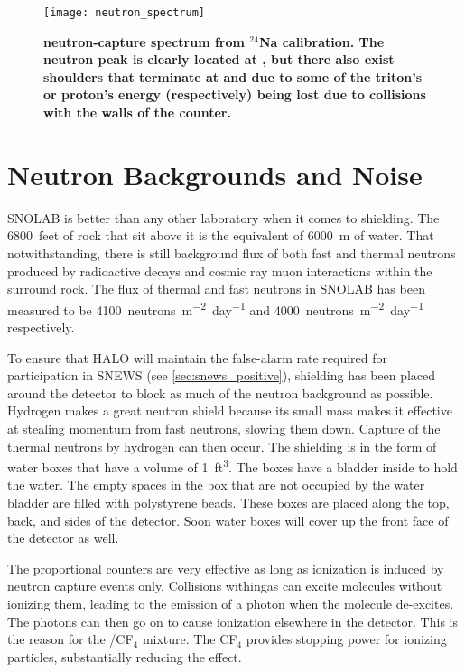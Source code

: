 		\begin{figure}[H]
			\centering
			\texttt{[image: neutron\_spectrum]}
			\caption[Example Neutron-Capture Spectrum]{\bf \he neutron-capture spectrum from $^{24}$Na calibration\rm \cite{Search2011}. The neutron peak is clearly located at , but there also exist shoulders that terminate at  and  due to some of the triton's or proton's energy (respectively) being lost due to collisions with the walls of the counter.}
			\label{fig:neutron_spectrum}
		\end{figure}


	\section{Neutron Backgrounds and Noise}
	\label{sec:noise}

		SNOLAB is better than any other laboratory when it comes to shielding. The \SI[mode=text]{6800}{feet} of rock that sit above it is the equivalent of \SI{6000}{\meter} of water. That notwithstanding, there is still background flux of both fast and thermal neutrons produced by radioactive decays and cosmic ray muon interactions within the surround rock. The flux of thermal and fast neutrons in SNOLAB has been measured to be \SI[mode=text]{4100}{neutrons.m^{-2}.day^{-1}} and \SI[mode=text]{4000}{neutrons.m^{-2}.day^{-1}} respectively\cite{handbook}. 

		To ensure that HALO will maintain the false-alarm rate required for participation in SNEWS (see \SEC \ref{sec:snews_positive}), shielding has been placed around the detector to block as much of the neutron background as possible. Hydrogen makes a great neutron shield because its small mass makes it effective at stealing momentum from fast neutrons, slowing them down. Capture of the thermal neutrons by hydrogen can then occur. The shielding is in the form of water boxes that have a volume of \SI[mode=text]{1}{ft^3}. The boxes have a bladder inside to hold the water. The empty spaces in the box that are not occupied by the water bladder are filled with polystyrene beads. These boxes are placed along the top, back, and sides of the detector. Soon water boxes will cover up the front face of the detector as well.
	 
		The proportional counters are very effective as long as ionization is induced by neutron capture events only. Collisions within\he gas can excite molecules without ionizing them, leading to the emission of a photon when the molecule de-excites. The photons can then go on to cause ionization elsewhere in the detector. This is the reason for the \he/CF$_4$ mixture. The CF$_4$ provides stopping power for ionizing particles, substantially reducing the effect.

